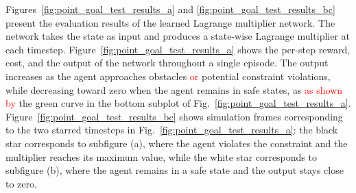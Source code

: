 Figures~\ref{fig:point_goal_test_results_a} and \ref{fig:point_goal_test_results_bc} present the evaluation results of the learned Lagrange multiplier network. 
The network takes the state as input and produces a state-wise Lagrange multiplier at each timestep.
Figure~\ref{fig:point_goal_test_results_a} shows the per-step reward, cost, and the output of the network throughout a single episode.
The output increases as the agent approaches obstacles \textcolor{red}{or} potential constraint violations, while decreasing toward zero when the agent remains in safe states, as \textcolor{red}{as shown by} the green curve in the bottom subplot of Fig.~\ref{fig:point_goal_test_results_a}.
Figure~\ref{fig:point_goal_test_results_bc} shows simulation frames corresponding to the two starred timesteps in Fig.~\ref{fig:point_goal_test_results_a}: the black star corresponds to subfigure (a), where the agent violates the constraint and the multiplier reaches its maximum value, while the white star corresponds to subfigure (b), where the agent remains in a safe state and the output stays close to zero.